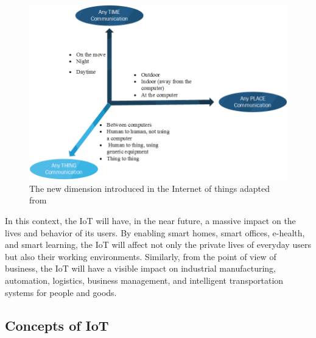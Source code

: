 \begin{figure}[htbp]
    \centering
    \includegraphics[width=1\textwidth]{resources/images/dimonsion}
    \caption{The new dimension introduced in the Internet of things adapted from~\cite{gazi} }\label{fig:contrib2:d}
\end{figure}
In this context, the IoT will have, in the near future, a massive impact on the lives and behavior of its users. By enabling smart homes, smart offices, e-health, and smart learning, the IoT will affect not only the private lives of everyday users but also their working environments. Similarly, from the point of view of business, the IoT will have a visible impact on industrial manufacturing, automation, logistics, business management, and intelligent transportation systems for people and goods.

\subsection{Concepts of IoT}

